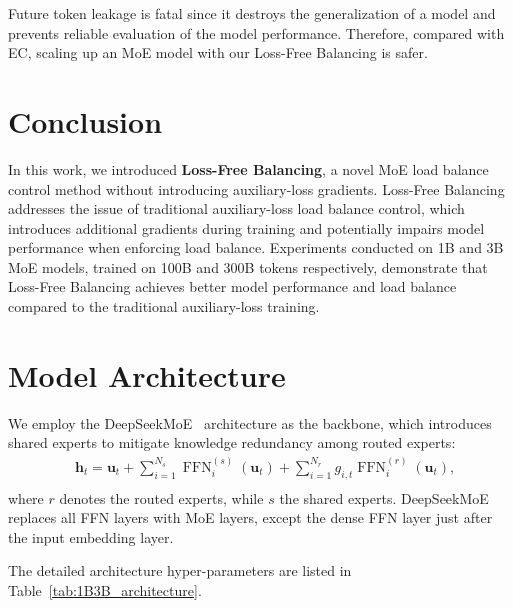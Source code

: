 \documentclass{article}
\newcommand{\ours}{Loss-Free Balancing}
\newcommand{\Ours}{Loss-Free Balancing}
\begin{document}
Future token leakage is fatal since it destroys the generalization of a model and prevents reliable evaluation of the model performance.
Therefore, compared with EC, scaling up an MoE model with our \ours{} is safer. 

\section{Conclusion}
In this work, we introduced \textbf{\ours{}}, a novel MoE load balance control method without introducing auxiliary-loss gradients. \Ours{} addresses the issue of traditional auxiliary-loss load balance control, which introduces additional gradients during training and potentially impairs model performance when enforcing load balance. Experiments conducted on 1B and 3B MoE models, trained on 100B and 300B tokens respectively, demonstrate that \ours{} achieves better model performance and load balance compared to the traditional auxiliary-loss training.




\appendix
\section{Model Architecture}
\label{app:model_achitecture}
We employ the DeepSeekMoE~\citep{Dai2024DeepSeekMoETU} architecture as the backbone, which introduces shared experts to mitigate knowledge redundancy among routed experts:
\begin{equation}
    \begin{aligned}
& \mathbf{h}_t=\mathbf{u}_t+\sum_{i=1}^{N_s} \operatorname{FFN}_i^{(s)}\left(\mathbf{u}_t\right)+\sum_{i=1}^{N_r} g_{i, t} \operatorname{FFN}_i^{(r)}\left(\mathbf{u}_t\right), \\
\end{aligned}
\end{equation}
where $r$ denotes the routed experts, while $s$ the shared experts. DeepSeekMoE replaces all FFN layers with MoE layers, except the dense FFN layer just after the input embedding layer.

The detailed architecture hyper-parameters are listed in Table~\ref{tab:1B3B_architecture}.
\end{document}
